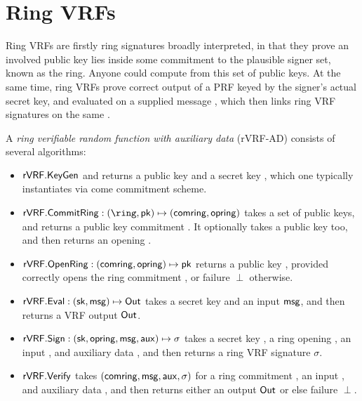 \section{Ring VRFs}
\label{sec:rvrf}

Ring VRFs are firstly ring signatures broadly interpreted, in that they
prove an involved public key lies inside some commitment \comring to
the plausible signer set, known as the ring.
Anyone could compute \comring from this set of public keys.
%
At the same time, ring VRFs prove correct output of a PRF keyed by
the signer's actual secret key, and evaluated on a supplied message \msg,
which then links ring VRF signatures on the same \msg.

\begin{definition}
A {\em ring verifiable random function with auxiliary data} (rVRF-AD)
consists of several algorithms:
\begin{itemize}
	\item ${\mathsf{rVRF}}.{\mathsf{KeyGen}}$ and returns a public key \pk and a secret key \sk, which one typically instantiates via come commitment scheme. 
	\item $\rVRF.\CommitRing : (\ring,\pk) \mapsto (\comring,\openring)$ takes a set \ring of public keys, and returns a public key commitment \comring.  It optionally takes a public key \pk too, and then returns an opening \openring.
	\item ${\mathsf{rVRF}}.{\mathsf{OpenRing}} : (\mathsf{comring},\mathsf{opring}) \mapsto \mathsf{pk}$ returns a public key \pk, provided \openring correctly opens the ring commitment \comring, or failure $\perp$ otherwise.
	\item ${\mathsf{rVRF}}.{\mathsf{Eval}} : (\mathsf{sk},\mathsf{msg}) \mapsto {\ensuremath{\mathsf{Out}}}$  takes a secret key \sk and an input $\mathsf{msg}$, and then returns a VRF output ${\mathsf{Out}}$.
	\item ${\mathsf{rVRF}}.{\mathsf{Sign}} : (\mathsf{sk},\mathsf{opring},\mathsf{msg},\mathsf{aux}) \mapsto \sigma$ takes a secret key \sk, a ring opening \openring, an input \msg, and auxiliary data \aux, and then returns a ring VRF signature $\sigma$.
	\item ${\mathsf{rVRF}}.{\mathsf{Verify}}$ takes $(\mathsf{comring},\mathsf{msg},\mathsf{aux},\sigma)$ for a ring commitment \comring, an input \msg, and auxiliary data \aux, and then returns either an output ${\mathsf{Out}}$ or else failure $\perp$.
\end{itemize}
\end{definition}





% 


\endinput
 

